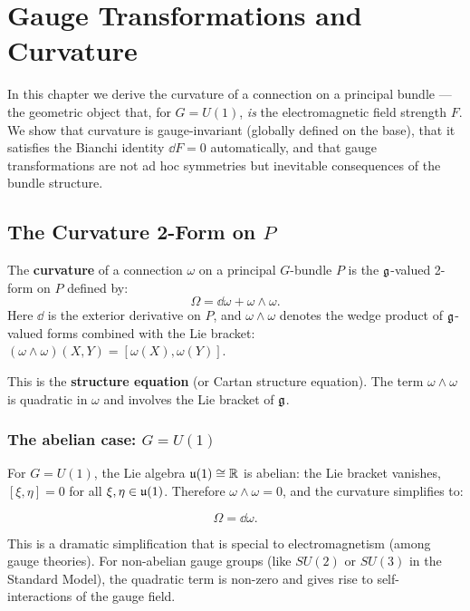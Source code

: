\chapter{Gauge Transformations and Curvature}

In this chapter we derive the curvature of a connection on a principal bundle --- the geometric object that, for $G = U(1)$, \emph{is} the electromagnetic field strength $F$. We show that curvature is gauge-invariant (globally defined on the base), that it satisfies the Bianchi identity $\dd F = 0$ automatically, and that gauge transformations are not ad hoc symmetries but inevitable consequences of the bundle structure.

\section{The Curvature 2-Form on $P$}

\begin{definition}[Curvature]
The \textbf{curvature} of a connection $\omega$ on a principal $G$-bundle $P$ is the $\mathfrak{g}$-valued 2-form on $P$ defined by:
\begin{equation}
\boxed{\Omega = \dd\omega + \omega \wedge \omega.}
\end{equation}
Here $\dd$ is the exterior derivative on $P$, and $\omega \wedge \omega$ denotes the wedge product of $\mathfrak{g}$-valued forms combined with the Lie bracket: $(\omega \wedge \omega)(X, Y) = [\omega(X), \omega(Y)]$.
\end{definition}

This is the \textbf{structure equation} (or Cartan structure equation). The term $\omega \wedge \omega$ is quadratic in $\omega$ and involves the Lie bracket of $\mathfrak{g}$.

\subsection{The abelian case: $G = U(1)$}

For $G = U(1)$, the Lie algebra $\mathfrak{u}(1) \cong \mathbb{R}$ is abelian: the Lie bracket vanishes, $[\xi, \eta] = 0$ for all $\xi, \eta \in \mathfrak{u}(1)$. Therefore $\omega \wedge \omega = 0$, and the curvature simplifies to:

\begin{equation}
\Omega = \dd\omega.
\end{equation}

This is a dramatic simplification that is special to electromagnetism (among gauge theories). For non-abelian gauge groups (like $SU(2)$ or $SU(3)$ in the Standard Model), the quadratic term is non-zero and gives rise to self-interactions of the gauge field.

